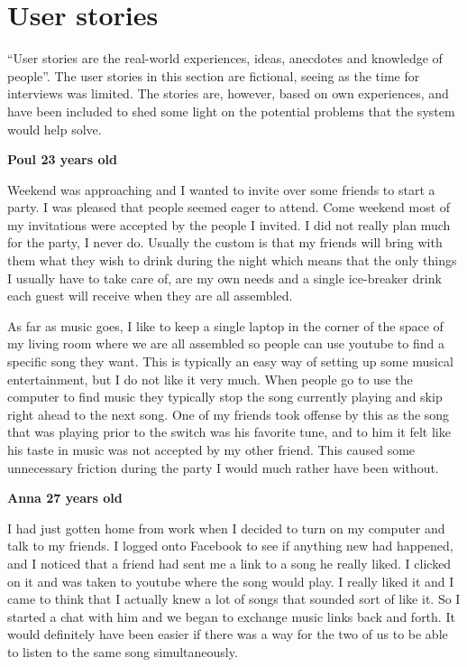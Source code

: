 \section{User stories}

``User stories are the real-world experiences, ideas, anecdotes and knowledge of people''\cite{Benyon10}. The user stories in this section are fictional, seeing as the time for interviews was limited. The stories are, however, based on own experiences, and have been included to shed some light on the potential problems that the system would help solve.

\vspace{5 mm}
\textbf{Poul 23 years old}

\vspace{5 mm}
\noindent
Weekend was approaching and I wanted to invite over some friends to start a party. I was pleased that people seemed eager to attend. Come weekend most of my invitations were accepted by the people I invited. I did not really plan much for the party, I never do. Usually the custom is that my friends will bring with them what they wish to drink during the night which means that the only things I usually have to take care of, are my own needs and a single ice-breaker drink each guest will receive when they are all assembled.  

As far as music goes, I like to keep a single laptop in the corner of the space of my living room where we are all assembled so people can use youtube to find a specific song they want. This is typically an easy way of setting up some musical entertainment, but I do not like it very much. When people go to use the computer to find music they typically stop the song currently playing and skip right ahead to the next song. One of my friends took offense by this as the song that was playing prior to the switch was his favorite tune, and to him it felt like his taste in music was not accepted by my other friend. This caused some unnecessary friction during the party I would much rather have been without.

\vspace{5 mm}
\noindent
\textbf{Anna 27 years old}

\vspace{5 mm}
\noindent
I had just gotten home from work when I decided to turn on my computer and talk to my friends. I logged onto Facebook to see if anything new had happened, and I noticed that a friend had sent me a link to a song he really liked. I clicked on it and was taken to youtube where the song would play. I really liked it and I came to think that I actually knew a lot of songs that sounded sort of like it. So I started a chat with him and we began to exchange music links back and forth. It would definitely have been easier if there was a way for the two of us to be able to listen to the same song simultaneously. 

